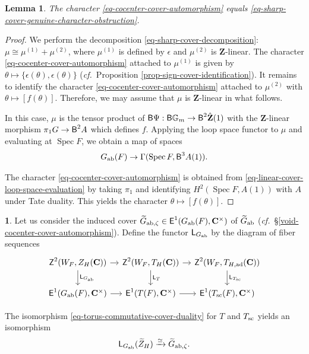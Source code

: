 \documentclass[10pt,english,reqno]{amsart}
\newcommand{\integers}{\mathbf Z}
\newcommand{\complexes}{\mathbf C}
\newcommand{\cycle}{\textnormal{\textsf{Z}}}
\newcommand{\extension}{\textnormal{\textsf{E}}}
\newcommand{\deloop}{\textnormal{\textsf{B}}}
\newcommand{\Spec}{\operatorname{Spec}}
\newcommand{\sconn}{\textnormal{sc}}
\newcommand{\adjoint}{\textnormal{ad}}
\newcommand{\abelian}{\textnormal{ab}}
\newcommand{\Langlands}{\textnormal{\textsf{L}}}
\newtheorem{lem}[subsubsection]{Lemma}
\theoremstyle{definition}
\numberwithin{equation}{section}
\newtheorem{untitledsubsubsection}[subsubsection]{}
\newenvironment{void}
{\begin{untitledsubsubsection}}
{\end{untitledsubsubsection}}
\begin{document}

\begin{lem}
\label{lem-cocenter-cover-automorphism}
The character \eqref{eq-cocenter-cover-automorphism} equals \eqref{eq-sharp-cover-genuine-character-obstruction}.
\end{lem}
\begin{proof}
We perform the decomposition \eqref{eq-sharp-cover-decomposition}: $\mu \cong \mu^{(1)} + \mu^{(2)}$, where $\mu^{(1)}$ is defined by $\epsilon$ and $\mu^{(2)}$ is $\integers$-linear. The character \eqref{eq-cocenter-cover-automorphism} attached to $\mu^{(1)}$ is given by $\theta\mapsto \{\epsilon(\theta), \epsilon(\theta)\}$ (\emph{cf.}~Proposition \ref{prop-sign-cover-identification}). It remains to identify the character \eqref{eq-cocenter-cover-automorphism} attached to $\mu^{(2)}$ with $\theta \mapsto [f(\theta)]$. Therefore, we may assume that $\mu$ is $\integers$-linear in what follows.

In this case, $\mu$ is the tensor product of $\deloop\Psi : \deloop \mathbb G_m \rightarrow \deloop^2\hat{\integers}(1)$ with the $\integers$-linear morphism $\pi_1 G \rightarrow \deloop^2A$ which defines $f$. Applying the loop space functor to $\mu$ and evaluating at $\Spec F$, we obtain a map of spaces
\begin{equation}
\label{eq-linear-cover-loop-space-evaluation}
G_{\abelian}(F) \rightarrow \Gamma(\Spec F, \deloop^3A(1)).
\end{equation}

The character \eqref{eq-cocenter-cover-automorphism} is obtained from \eqref{eq-linear-cover-loop-space-evaluation} by taking $\pi_1$ and identifying $H^2(\Spec F, A(1))$ with $A$ under Tate duality. This yields the character $\theta \mapsto [f(\theta)]$.
\end{proof}


\begin{void}
Let us consider the induced cover $\widetilde G_{\abelian, \zeta} \in \extension^1(G_{\abelian}(F), \complexes^{\times})$ of $\widetilde G_{\abelian}$ (\emph{cf.}~\S\ref{void-cocenter-cover-automorphism}). Define the functor $\Langlands_{G_{\abelian}}$ by the diagram of fiber sequences
$$
\begin{tikzcd}[column sep = 1em]
	\cycle^2(W_F, Z_H(\complexes)) \ar[r]\ar[d, "\Langlands_{G_{\abelian}}"] & \cycle^2(W_F, T_H(\complexes)) \ar[r]\ar[d, "\Langlands_T"] & \cycle^2(W_F, T_{H, \adjoint}(\complexes)) \ar[d, "\Langlands_{T_{\sconn}}"] \\
	\extension^1(G_{\abelian}(F), \complexes^{\times}) \ar[r] & \extension^1(T(F), \complexes^{\times}) \ar[r] & \extension^1(T_{\sconn}(F), \complexes^{\times})
\end{tikzcd}
$$

The isomorphism \eqref{eq-torus-commutative-cover-duality} for $T$ and $T_{\sconn}$ yields an isomorphism
\begin{equation}
\label{eq-cocenter-commutative-cover-duality}
\Langlands_{G_{\abelian}}(\widetilde Z_H) \xrightarrow{\simeq} \widetilde G_{\abelian, \zeta}.
\end{equation}
\end{void}
\end{document}
